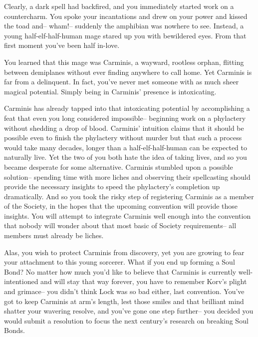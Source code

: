 \documentclass[char]{Sel}
\begin{document}
Clearly, a dark spell had backfired, and you immediately started work on a countercharm. You spoke your incantations and drew on your power and kissed the toad and-- wham!-- suddenly the amphibian was nowhere to see. Instead, a young half-elf-half-human mage stared up you with bewildered eyes. From that first moment you've been half in-love.

You learned that this mage was Carminis, a wayward, rootless orphan, flitting between demiplanes without ever finding anywhere to call home. Yet Carminis is far from a delinquent. In fact, you've never met someone with as much sheer magical potential. Simply being in Carminis' presence is intoxicating.

Carminis has already tapped into that intoxicating potential by accomplishing a feat that even you long considered impossible-- beginning work on a phylactery without shedding a drop of blood. Carminis' intuition claims that it should be possible even to finish the phylactery without murder but that such a process would take many decades, longer than a half-elf-half-human can be expected to naturally live. Yet the two of you both hate the idea of taking lives, and so you became desperate for some alternative.
Carminis stumbled upon a possible solution-- spending time with more liches and observing their spellcasting should provide the necessary insights to speed the phylactery's completion up dramatically. And so you took the risky step of registering Carminis as a member of the Society, in the hopes that the upcoming convention will provide those insights. You will attempt to integrate Carminis well enough into the convention that nobody will wonder about that most basic of Society requirements-- all members must already be liches.

Alas, you wish to protect Carminis from discovery, yet you are growing to fear your attachment to this young sorcerer. What if you end up forming a Soul Bond? No matter how much you'd like to believe that Carminis is currently well-intentioned and will stay that way forever, you have to remember Korv's plight and grimace-- you didn't think Lock was so bad either, last convention. You've got to keep Carminis at arm's length, lest those smiles and that brilliant mind shatter your wavering resolve, and you've gone one step further-- you decided you would submit a resolution to focus the next century's research on breaking Soul Bonds.
\end{document}
